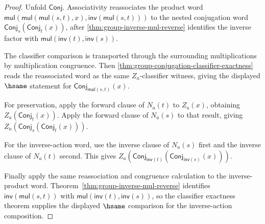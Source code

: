 \begin{proof}
Unfold $\mathsf{Conj}$. Associativity reassociates the product word
$\mathsf{mul}(\mathsf{mul}(\mathsf{mul}(s,t),x),
\mathsf{inv}(\mathsf{mul}(s,t)))$ to the nested conjugation word
$\mathsf{Conj}_s(\mathsf{Conj}_t(x))$, after
\autoref{thm:group-inverse-mul-reverse} identifies the inverse factor with
$\mathsf{mul}(\mathsf{inv}(t),\mathsf{inv}(s))$.

The classifier comparison is transported through the surrounding
multiplications by multiplication congruence. Then
\autoref{thm:group-conjugation-classifier-exactness} reads the reassociated
word as the same $Z_a$-classifier witness, giving the displayed
$\hsame$ statement for $\mathsf{Conj}_{\mathsf{mul}(s,t)}(x)$.

For preservation, apply the forward clause of $N_a(t)$ to $Z_a(x)$, obtaining
$Z_a(\mathsf{Conj}_t(x))$. Apply the forward clause of $N_a(s)$ to that
result, giving $Z_a(\mathsf{Conj}_s(\mathsf{Conj}_t(x)))$.

For the inverse-action word, use the inverse clause of $N_a(s)$ first and the
inverse clause of $N_a(t)$ second. This gives
$Z_a(\mathsf{Conj}_{\mathsf{inv}(t)}
(\mathsf{Conj}_{\mathsf{inv}(s)}(x)))$.

Finally apply the same reassociation and congruence calculation to the
inverse-product word. Theorem~\ref{thm:group-inverse-mul-reverse} identifies
$\mathsf{inv}(\mathsf{mul}(s,t))$ with
$\mathsf{mul}(\mathsf{inv}(t),\mathsf{inv}(s))$, so the classifier exactness
theorem supplies the displayed $\hsame$ comparison for the inverse-action
composition.
\end{proof}

